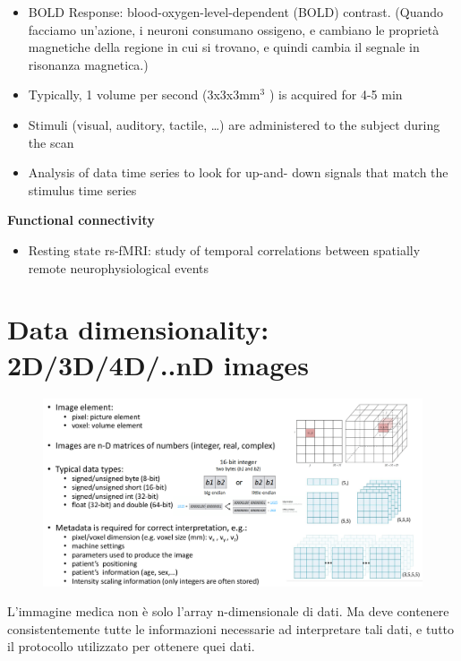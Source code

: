 \begin{itemize}
	\item BOLD Response: blood-oxygen-level-dependent (BOLD) contrast. (Quando facciamo un'azione, i neuroni consumano ossigeno, e cambiano le proprietà magnetiche della regione in cui si trovano, e quindi cambia il segnale in risonanza magnetica.)
	\item Typically, 1 volume per second (3x3x3mm$^3$ ) is
	acquired for 4-5 min
	\item Stimuli (visual, auditory, tactile, …) are
	administered to the subject during the scan
	\item Analysis of data time series to look for up-and-
	down signals that match the stimulus time
	series
\end{itemize}

\textbf{Functional connectivity}

\begin{itemize}
	\item Resting state rs-fMRI: study of temporal correlations between spatially remote neurophysiological events
\end{itemize}

\newpage

\section{Data dimensionality: 2D/3D/4D/..nD images}

\begin{figure}[ht]
	\centering
	\includegraphics[width=1\linewidth]{figure_med/datadim}

\end{figure}
\FloatBarrier


L'immagine medica non è solo l'array n-dimensionale di dati. Ma deve contenere consistentemente tutte le informazioni necessarie ad interpretare tali dati, e tutto il protocollo utilizzato per ottenere quei dati.

